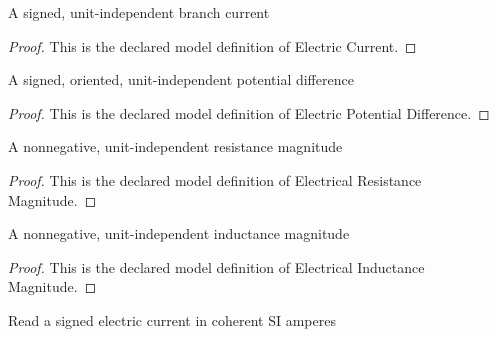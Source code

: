 \begin{definition}
  \label{def:physics:phyx-mini-0985:phyxminiproblems-problemphyxmini0985-electriccurrent}
  A signed, unit-independent branch current
\end{definition}
\begin{proof}
  This is the declared model definition of Electric Current.
\end{proof}
\begin{definition}
  \label{def:physics:phyx-mini-0985:phyxminiproblems-problemphyxmini0985-electricpotentialdifference}
  A signed, oriented, unit-independent potential difference
\end{definition}
\begin{proof}
  This is the declared model definition of Electric Potential Difference.
\end{proof}
\begin{definition}
  \label{def:physics:phyx-mini-0985:phyxminiproblems-problemphyxmini0985-electricalresistancemagnitude}
  A nonnegative, unit-independent resistance magnitude
\end{definition}
\begin{proof}
  This is the declared model definition of Electrical Resistance Magnitude.
\end{proof}
\begin{definition}
  \label{def:physics:phyx-mini-0985:phyxminiproblems-problemphyxmini0985-electricalinductancemagnitude}
  A nonnegative, unit-independent inductance magnitude
\end{definition}
\begin{proof}
  This is the declared model definition of Electrical Inductance Magnitude.
\end{proof}
\begin{definition}
  \label{def:physics:phyx-mini-0985:phyxminiproblems-problemphyxmini0985-electriccurrentinamperes}
  Read a signed electric current in coherent SI amperes
\end{definition}
